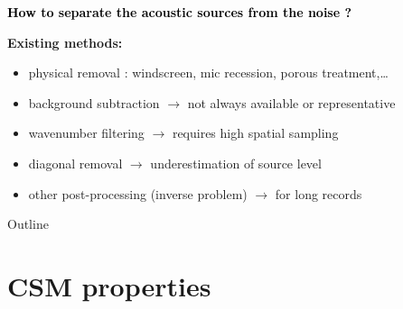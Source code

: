 \documentclass[10pt,xcolor=x11names,compress, show notes]{beamer}%
\begin{document}
\begin{frame}[t]{\insertsectionhead}
	\begin{center}
		\textcolor{black}{\bfseries \centering  How to separate the acoustic sources from the noise ?}
	\end{center}
	\vfill
{ \bfseries Existing methods:}
\small
	\begin{itemize}
        		\item physical removal : windscreen, mic recession, porous treatment,\dots
        		\item background subtraction $\rightarrow$ not always available or representative
        		\item wavenumber filtering $\rightarrow$ requires high spatial sampling
        		\item diagonal removal $\rightarrow$ underestimation of source level
        		\item other post-processing (inverse problem) $\rightarrow$ for long records
	\end{itemize}

	\vfill
{}
\end{frame}

\begin{frame}{Outline}
	\tableofcontents[]
\end{frame}

\section{CSM properties}
\end{document}
